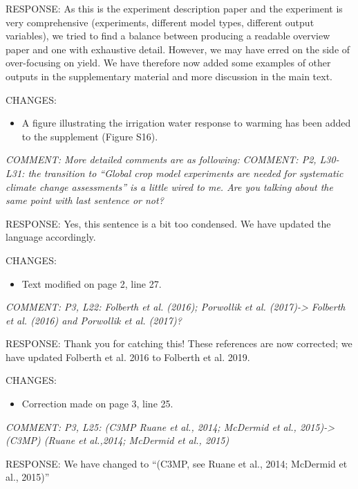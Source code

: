 \documentclass[gmd, manuscript]{copernicus} %
\begin{document}
RESPONSE: As this is the experiment description paper and the experiment is very comprehensive (experiments, different model types, different output variables), we tried to find a balance between producing a readable overview paper and one with exhaustive detail. However, we may have erred on the side of over-focusing on yield. We have therefore now added some examples of other outputs in the supplementary material and more discussion in the main text.
\smallskip

CHANGES:
\begin{itemize}
    \item A figure illustrating the irrigation water response to warming has been added to the supplement (Figure S16).
\end{itemize}

\smallskip

\textcolor{dark-gray}{\textit{COMMENT: More detailed comments are as following:}}
\textcolor{dark-gray}{\textit{COMMENT: P2, L30-L31: the transition to “Global crop model experiments are needed for systematic climate change assessments” is a little wired to me. Are you talking about the same point with last sentence or not?}}

RESPONSE: Yes, this sentence is a bit too condensed. We have updated the language accordingly. 
\smallskip

CHANGES:
\begin{itemize}
    \item Text modified on page 2, line 27.
\end{itemize}

\smallskip

\textcolor{dark-gray}{\textit{COMMENT: P3, L22: Folberth et al. (2016); Porwollik et al. (2017)-> Folberth et al. (2016) and Porwollik et al. (2017)?}}

RESPONSE: Thank you for catching this! These references are now corrected; we have updated Folberth et al. 2016 to Folberth et al. 2019.
\smallskip

CHANGES:
\begin{itemize}
    \item Correction made on page 3, line 25.
\end{itemize}

\smallskip

\textcolor{dark-gray}{\textit{COMMENT: P3, L25: (C3MP Ruane et al., 2014; McDermid et al., 2015)-> (C3MP) (Ruane et al.,2014; McDermid et al., 2015)}}

RESPONSE: We have changed to “(C3MP, see Ruane et al., 2014; McDermid et al., 2015)”
\smallskip
\end{document}
